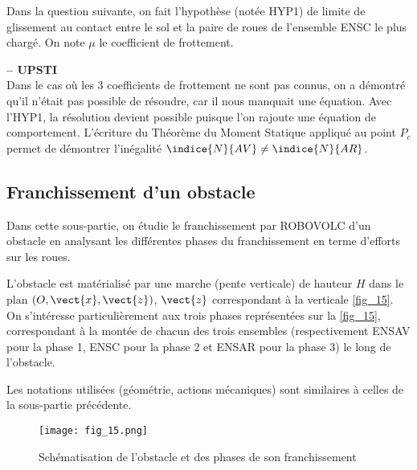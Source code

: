 \ifprof
Dans la question suivante, on fait l'hypothèse (notée HYP1) de limite de glissement au contact
entre le sol et la paire de roues de l'ensemble ENSC le plus chargé. On note $\mu$ le coefficient
de frottement.
\else
\fi

\ifprof
\begin{corrige}\textbf{ -- UPSTI}\\ 
Dans le cas où les 3 coefficients de frottement ne sont pas connus, on a démontré qu’il n’était pas possible de résoudre, car il nous manquait une équation.
Avec l’HYP1, la résolution devient possible puisque l’on rajoute une équation de comportement.
L’écriture du Théorème du Moment Statique appliqué au point $P_c$  permet de démontrer l’inégalité $\indice{N}{AV}\neq \indice{N}{AR}$.

\end{corrige}
\else
\fi

\subsection{Franchissement d'un obstacle}

\begin{obj}
Dans cette sous-partie, on étudie le franchissement par ROBOVOLC d'un obstacle en
analysant les différentes phases du franchissement en terme d'efforts sur les roues.
\end{obj}
\ifprof\else
L'obstacle est matérialisé par une marche (pente verticale) de hauteur $H$ dans le plan $\left(O,\vect{x},\vect{z}\right)$,
$\vect{z}$ correspondant à la verticale \autoref{fig_15}.
On s'intéresse particulièrement aux trois phases représentées sur la \autoref{fig_15}, correspondant à la
montée de chacun des trois ensembles (respectivement ENSAV pour la phase 1, ENSC pour la
phase 2 et ENSAR pour la phase 3) le long de l'obstacle.

Les notations utilisées (géométrie, actions mécaniques) sont similaires à celles de la sous-partie
précédente.

\begin{figure}[H]
\centering
\texttt{[image: fig\_15.png]}
\caption{Schématisation de l'obstacle et des phases de son franchissement\label{fig_15}}
\end{figure}
\fi


